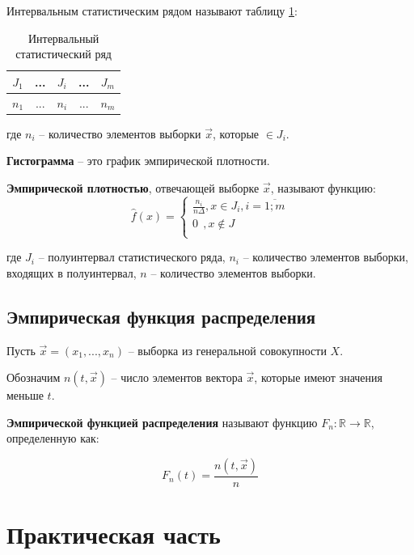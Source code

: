 Интервальным статистическим рядом называют таблицу \ref{table:row1}:

\begin{table}[ht!]
	\captionsetup{singlelinecheck = false, justification=centering}
	\caption{Интервальный статистический ряд}
	\centering
	\label{table:row1}
	\begin{tabular}{|c|c|c|c|c|}
		\hline
		$J_1$ & ... & $J_i$ & ... & $J_m$ \\
		\hline
		$n_1$ & ... & $n_i$ & ... & $n_m$ \\
		\hline
	\end{tabular}
\end{table}

где $n_i$ -- количество элементов выборки $\vec x$, которые $\in J_i$.

\textbf{Гистограмма} -- это график эмпирической плотности. 

\textbf{Эмпирической плотностью}, отвечающей выборке $\vec x$, называют функцию:
\begin{equation}
	\hat f(x) =
	\begin{cases}
		\frac{n_i}{n \Delta}, x \in J_i, i = \overline{1; m} \\
		0\ \ , x \not\in J \\
	\end{cases}
\end{equation}

где $J_i$ -- полуинтервал статистического ряда, 
$n_i$ -- количество элементов выборки, входящих в полуинтервал, 
$n$ -- количество элементов выборки.


\section{Эмпирическая функция распределения}

Пусть $\vec x = (x_1, ..., x_n)$ -- выборка из генеральной совокупности $X$. 

Обозначим $n(t, \vec x)$ -- число элементов вектора $\vec x$, которые имеют значения меньше $t$.

\textbf{Эмпирической функцией распределения} называют функцию \newline
$F_n: \mathbb{R} \to \mathbb{R}$, определенную как: 

\begin{equation}
	F_n(t) = \frac{n(t, \vec x)}{n}
\end{equation}


\chapter{Практическая часть}
